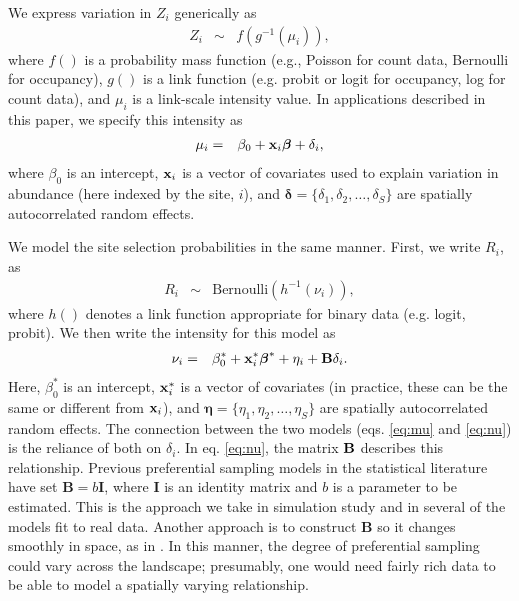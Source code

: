 \documentclass[times,mee,doublespace,]{besauth2}
\begin{document}
\begin{flushleft}
\hspace{0.5in} We express variation in $Z_i$ generically as
\begin{eqnarray}
  \label{eq:process}
  Z_i & \sim & f(g^{-1}(\mu_i)),
\end{eqnarray}
where $f()$ is a probability mass function (e.g., Poisson for count data, Bernoulli for occupancy), $g()$ is a link function (e.g. probit or logit for occupancy, log for count data), and $\mu_i$ is a link-scale intensity value.  In applications described in this paper, we specify this intensity as
\begin{eqnarray}
\mu_i & = & \beta_0 + {\bf x}_i \boldsymbol{\beta}+\delta_i,
 \label{eq:mu}
\end{eqnarray}
where $\beta_0$ is an intercept, ${\bf x}_i$ is a vector of covariates used to explain variation in abundance (here indexed by the site, $i$), and $\boldsymbol{\delta}=\{ \delta_1,\delta_2,\hdots,\delta_S \}$ are spatially autocorrelated random effects.

\hspace{0.5in} We model the site selection probabilities in the same manner.  First, we write $R_i$, as
\begin{eqnarray}
 \label{eq:R}
  R_i & \sim & \text{Bernoulli}(h^{-1}(\nu_i)),
\end{eqnarray}
where $h()$ denotes a link function appropriate for binary data (e.g. logit, probit).  We then write the intensity for this model as
\begin{eqnarray}
  \label{eq:nu}
  \nu_i & = & \beta_0^* + {\bf x}_i^* \boldsymbol{\beta}^*+\eta_i+{\bf B} \delta_i.
\label{eq:nu}
\end{eqnarray}
Here, $\beta_0^*$ is an intercept, ${\bf x}_i^*$ is a vector of covariates (in practice, these can be the same or different from ${\bf x}_i$), and $\boldsymbol{\eta}=\{ \eta_1,\eta_2,\hdots,\eta_S \}$ are spatially autocorrelated random effects.  The connection between the two models (eqs. \ref{eq:mu} and \ref{eq:nu}) is the reliance of both on $\delta_i$.  In eq. \ref{eq:nu}, the matrix ${\bf B}$ describes this relationship.  Previous preferential sampling models in the statistical literature have set $\textbf{B} = b \textbf{I}$, where $\textbf{I}$ is an identity matrix and $b$ is a parameter to be estimated.  This is the approach we take in simulation study and in several of the models fit to real data.  Another approach is to construct $\textbf{B}$ so it changes smoothly in space, as in \citep{RoyleBerliner1999}.  In this manner, the degree of preferential sampling could vary across the landscape; presumably, one would need fairly rich data to be able to model a spatially varying relationship.


\end{flushleft}
\end{document}
